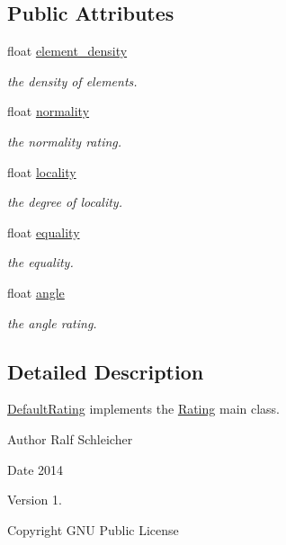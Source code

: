 \subsection*{\-Public \-Attributes}
\begin{DoxyCompactItemize}
\item 
float \hyperlink{structnext__best__view_1_1DefaultRating_adca56e4ed72fb20431dd06450766bfdd}{element\-\_\-density}
\begin{DoxyCompactList}\small\item\em the density of elements. \end{DoxyCompactList}\item 
float \hyperlink{structnext__best__view_1_1DefaultRating_a4e90c062499c1516f3a89ac83b0e8e42}{normality}
\begin{DoxyCompactList}\small\item\em the normality rating. \end{DoxyCompactList}\item 
float \hyperlink{structnext__best__view_1_1DefaultRating_a5527534f5ed7009fd7b399ef2e3c594e}{locality}
\begin{DoxyCompactList}\small\item\em the degree of locality. \end{DoxyCompactList}\item 
float \hyperlink{structnext__best__view_1_1DefaultRating_a7e21af06d8a9897fb8420c4cdf27241e}{equality}
\begin{DoxyCompactList}\small\item\em the equality. \end{DoxyCompactList}\item 
float \hyperlink{structnext__best__view_1_1DefaultRating_a7f476b7b6786c5363cfa96f9a8b717c7}{angle}
\begin{DoxyCompactList}\small\item\em the angle rating. \end{DoxyCompactList}\end{DoxyCompactItemize}


\subsection{\-Detailed \-Description}
\hyperlink{structnext__best__view_1_1DefaultRating}{\-Default\-Rating} implements the \hyperlink{structnext__best__view_1_1Rating}{\-Rating} main class. 

\begin{DoxyAuthor}{\-Author}
\-Ralf \-Schleicher 
\end{DoxyAuthor}
\begin{DoxyDate}{\-Date}
2014 
\end{DoxyDate}
\begin{DoxyVersion}{\-Version}
1. 
\end{DoxyVersion}
\begin{DoxyCopyright}{\-Copyright}
\-G\-N\-U \-Public \-License 
\end{DoxyCopyright}


